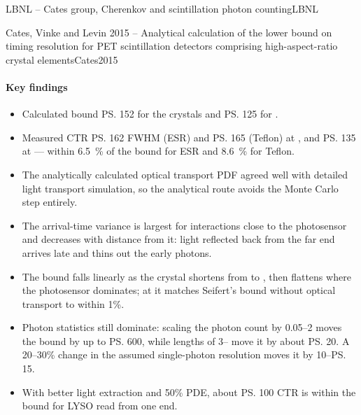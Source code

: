 \begin{programnote}{LBNL -- Cates group, Cherenkov and scintillation photon counting}{LBNL}
\begin{papernote}{Cates, Vinke and Levin 2015 -- Analytical calculation of the lower bound on timing resolution for PET scintillation detectors comprising high-aspect-ratio crystal elements}{Cates2015}
\paragraph{Key findings}
\begin{itemize}
	\item Calculated bound \ps{152 } for the
		 crystals and
		\ps{125 } for .
	\item Measured CTR \ps{162 } FWHM (ESR) and
		\ps{165 } (Teflon) at , and
		\ps{135 } at  --- within \qty{6.5}{\percent}
		of the bound for ESR and \qty{8.6}{\percent} for Teflon.
	\item The analytically calculated optical transport PDF agreed well with
		detailed light transport simulation, so the analytical route avoids the
		Monte Carlo step entirely.
	\item The arrival-time variance is largest for interactions close to the
		photosensor and decreases with distance from it: light reflected back
		from the far end arrives late and thins out the early photons.
	\item The bound falls linearly as the crystal shortens from  to
		, then flattens where the photosensor dominates; at  it
		matches Seifert's bound without optical transport to within 1\%.
	\item Photon statistics still dominate: scaling the photon count by
		0.05--2 moves the bound by up to \ps{600}, while lengths of
		3-- move it by about \ps{20}. A 20--30\% change in
		the assumed single-photon resolution moves it by 10--\ps{15}.
	\item With better light extraction and 50\% PDE, about \ps{100} CTR
		is within the bound for  LYSO read from one end.
\end{itemize}


\end{papernote}
\end{programnote}
